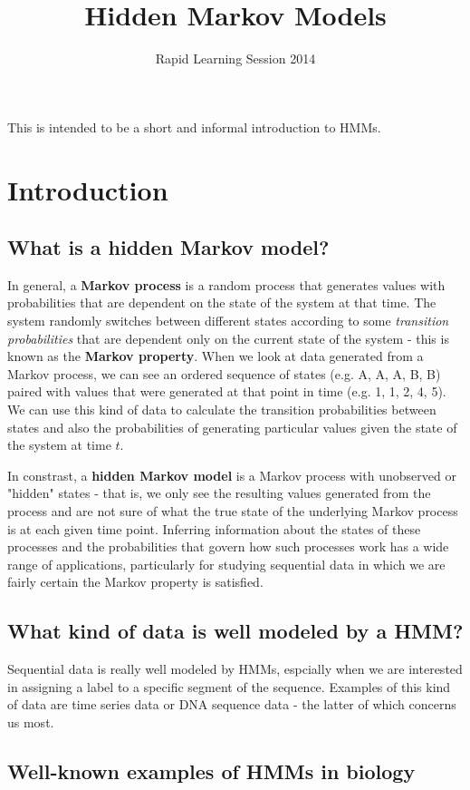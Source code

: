 \documentclass[11pt, oneside]{article}
\title{Hidden Markov Models}
\date{Rapid Learning Session 2014}
\begin{document}
\maketitle

This is intended to be a short and informal introduction to HMMs.

\section{Introduction}
\subsection{What is a hidden Markov model?}
In general, a \textbf{Markov process} is a random process that generates values with probabilities that are dependent on the state of the system at that time. The system randomly switches between different states according to some \textit{transition probabilities} that are dependent only on the current state of the system - this is known as the \textbf{Markov property}. When we look at data generated from a Markov process, we can see an ordered sequence of states (e.g. A, A, A, B, B) paired with values that were generated at that point in time (e.g. 1, 1, 2, 4, 5). We can use this kind of data to calculate the transition probabilities between states and also the probabilities of generating particular values given the state of the system at time $t$.

In constrast, a \textbf{hidden Markov model} is a Markov process with unobserved or "hidden" states - that is, we only see the resulting values generated from the process and are not sure of what the true state of the underlying Markov process is at each given time point. Inferring information about the states of these processes and the probabilities that govern how such processes work has a wide range of applications, particularly for studying sequential data in which we are fairly certain the Markov property is satisfied.

\subsection{What kind of data is well modeled by a HMM?}
Sequential data is really well modeled by HMMs, espcially when we are interested in assigning a label to a specific segment of the sequence. Examples of this kind of data are time series data or DNA sequence data - the latter of which concerns us most. 
\subsection{Well-known examples of HMMs in biology}
\end{document}
